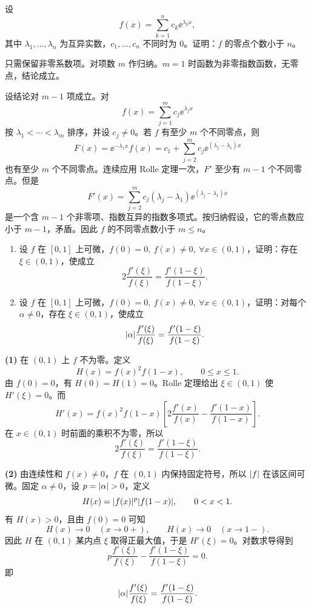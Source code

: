 \begin{xreferenceproblem}[5]
设
\[
  f(x)=\sum_{k=1}^n c_k\ee^{\lambda_kx},
\]
其中 $\lambda_1,\ldots,\lambda_n$ 为互异实数，$c_1,\ldots,c_n$ 不同时为 0。证明：$f$ 的零点个数小于 $n$。
\end{xreferenceproblem}
\begin{xsolution}
只需保留非零系数项。对项数 $m$ 作归纳。$m=1$ 时函数为非零指数函数，无零点，结论成立。

设结论对 $m-1$ 项成立。对
\[
  f(x)=\sum_{j=1}^m c_j\ee^{\lambda_jx}
\]
按 $\lambda_1<\cdots<\lambda_m$ 排序，并设 $c_j\neq0$。若 $f$ 有至少 $m$ 个不同零点，则
\[
  F(x)=\ee^{-\lambda_1x}f(x)
  =c_1+\sum_{j=2}^m c_j\ee^{(\lambda_j-\lambda_1)x}
\]
也有至少 $m$ 个不同零点。连续应用 Rolle 定理一次，$F'$ 至少有 $m-1$ 个不同零点。但是
\[
  F'(x)=\sum_{j=2}^m c_j(\lambda_j-\lambda_1)
  \ee^{(\lambda_j-\lambda_1)x}
\]
是一个含 $m-1$ 个非零项、指数互异的指数多项式。按归纳假设，它的零点数应小于 $m-1$，矛盾。因此 $f$ 的不同零点数小于 $m\leqslant n$。
\end{xsolution}


\begin{xreferenceproblem}[6]
\begin{enumerate}[label=(\arabic*)]
  \item 设 $f$ 在 $[0,1]$ 上可微，$f(0)=0,\ f(x)\neq0,\ \forall x\in(0,1)$，证明：存在 $\xi\in(0,1)$，使成立
  \[
    2\frac{f'(\xi)}{f(\xi)}=\frac{f'(1-\xi)}{f(1-\xi)}.
  \]
  \item 设 $f$ 在 $[0,1]$ 上可微，$f(0)=0,\ f(x)\neq0,\ \forall x\in(0,1)$，证明：对每个 $\alpha\neq0$，存在 $\xi\in(0,1)$，使成立
  \[
    \lvert\alpha\rvert\frac{f'(\xi)}{f(\xi)}=\frac{f'(1-\xi)}{f(1-\xi)}.
  \]
\end{enumerate}
\end{xreferenceproblem}
\begin{xsolution}
\textbf{(1)}\quad
在 $(0,1)$ 上 $f$ 不为零。定义
\[
  H(x)=f(x)^2f(1-x),\qquad0\leqslant x\leqslant1.
\]
由 $f(0)=0$，有 $H(0)=H(1)=0$。Rolle 定理给出 $\xi\in(0,1)$ 使 $H'(\xi)=0$。而
\[
  H'(x)=f(x)^2f(1-x)
  \left[2\frac{f'(x)}{f(x)}-
  \frac{f'(1-x)}{f(1-x)}\right].
\]
在 $x\in(0,1)$ 时前面的乘积不为零，所以
\[
  2\frac{f'(\xi)}{f(\xi)}
  =\frac{f'(1-\xi)}{f(1-\xi)}.
\]

\textbf{(2)}\quad
由连续性和 $f(x)\neq0$，$f$ 在 $(0,1)$ 内保持固定符号，所以 $\lvert f\rvert$ 在该区间可微。固定 $\alpha\neq0$，设 $p=\lvert\alpha\rvert>0$，定义
\[
  H(x)=\lvert f(x)\rvert^p\lvert f(1-x)\rvert,\qquad0<x<1.
\]
有 $H(x)>0$，且由 $f(0)=0$ 可知
\[
  H(x)\to0\quad(x\to0+),
  \qquad
  H(x)\to0\quad(x\to1-).
\]
因此 $H$ 在 $(0,1)$ 某内点 $\xi$ 取得正最大值，于是 $H'(\xi)=0$。对数求导得到
\[
  p\frac{f'(\xi)}{f(\xi)}
  -\frac{f'(1-\xi)}{f(1-\xi)}=0.
\]
即
\[
  \lvert\alpha\rvert\frac{f'(\xi)}{f(\xi)}
  =\frac{f'(1-\xi)}{f(1-\xi)}.
\]
\end{xsolution}


